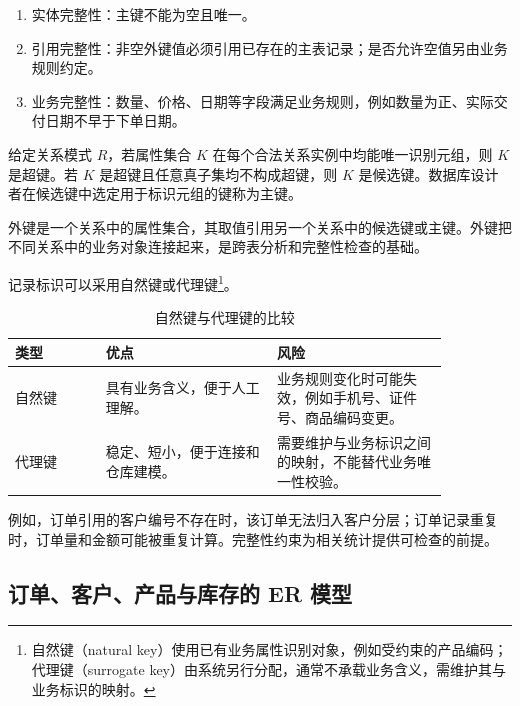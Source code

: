 \begin{enumerate}
  \item 实体完整性：主键不能为空且唯一。
  \item 引用完整性：非空外键值必须引用已存在的主表记录；是否允许空值另由业务规则约定。
  \item 业务完整性：数量、价格、日期等字段满足业务规则，例如数量为正、实际交付日期不早于下单日期。
\end{enumerate}

\begin{definition}[键]
给定关系模式 \(R\)，若属性集合 \(K\) 在每个合法关系实例中均能唯一识别元组，则 \(K\) 是超键。若 \(K\) 是超键且任意真子集均不构成超键，则 \(K\) 是候选键。数据库设计者在候选键中选定用于标识元组的键称为主键。
\end{definition}

\begin{definition}[外键]
外键是一个关系中的属性集合，其取值引用另一个关系中的候选键或主键。外键把不同关系中的业务对象连接起来，是跨表分析和完整性检查的基础。
\end{definition}

记录标识可以采用自然键或代理键\footnote{自然键（natural key）使用已有业务属性识别对象，例如受约束的产品编码；代理键（surrogate key）由系统另行分配，通常不承载业务含义，需维护其与业务标识的映射。}。

\begin{table}[htbp]
\centering
\caption{自然键与代理键的比较}
\begin{tabular}{P{0.18\linewidth}P{0.34\linewidth}P{0.34\linewidth}}
\toprule
{}
类型 & 优点 & 风险\\
\midrule
自然键 & 具有业务含义，便于人工理解。 & 业务规则变化时可能失效，例如手机号、证件号、商品编码变更。\\
代理键 & 稳定、短小，便于连接和仓库建模。 & 需要维护与业务标识之间的映射，不能替代业务唯一性校验。\\
\bottomrule
\end{tabular}
\end{table}

例如，订单引用的客户编号不存在时，该订单无法归入客户分层；订单记录重复时，订单量和金额可能被重复计算。完整性约束为相关统计提供可检查的前提。

\subsection{订单、客户、产品与库存的 ER 模型}

